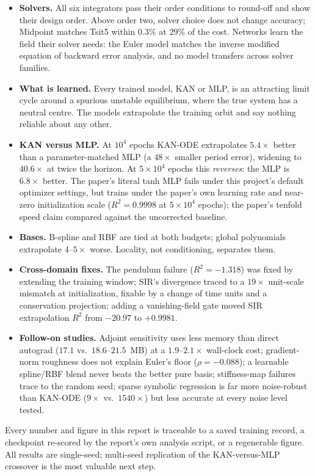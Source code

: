 \begin{keypoint}
\begin{itemize}
\item \textbf{Solvers.} All six integrators pass their order conditions to
  round-off and show their design order. Above order two, solver choice does
  not change accuracy; Midpoint matches Tsit5 within $0.3\%$ at $29\%$ of the
  cost. Networks learn the field their solver needs: the Euler model matches
  the inverse modified equation of backward error analysis, and no model
  transfers across solver families.
\item \textbf{What is learned.} Every trained model, KAN or MLP, is an
  attracting limit cycle around a spurious unstable equilibrium, where the
  true system has a neutral centre. The models extrapolate the training orbit
  and say nothing reliable about any other.
\item \textbf{KAN versus MLP.} At $10^4$ epochs KAN-ODE extrapolates
  $5.4\times$ better than a parameter-matched MLP (a $48\times$ smaller
  period error), widening to $40.6\times$ at twice the horizon. At
  $5\times10^4$ epochs this \emph{reverses}: the MLP is $6.8\times$ better.
  The paper's literal tanh MLP fails under this project's default optimizer
  settings, but trains under the paper's own learning rate and near-zero
  initialization scale ($R^2=0.9998$ at $5\times10^4$ epochs); the paper's
  tenfold speed claim compared against the uncorrected baseline.
\item \textbf{Bases.} B-spline and RBF are tied at both budgets; global
  polynomials extrapolate $4$--$5\times$ worse. Locality, not conditioning,
  separates them.
\item \textbf{Cross-domain fixes.} The pendulum failure ($R^2=-1.318$) was
  fixed by extending the training window; SIR's divergence traced to a
  $19\times$ unit-scale mismatch at initialization, fixable by a change of
  time units and a conservation projection; adding a vanishing-field gate
  moved SIR extrapolation $R^2$ from $-20.97$ to $+0.9981$.
\item \textbf{Follow-on studies.} Adjoint sensitivity uses less memory than
  direct autograd ($17.1$ vs.\ $18.6$--$21.5$~MB) at a $1.9$--$2.1\times$
  wall-clock cost; gradient-norm roughness does not explain Euler's floor
  ($\rho=-0.088$); a learnable spline/RBF blend never beats the better pure
  basis; stiffness-map failures trace to the random seed; sparse symbolic
  regression is far more noise-robust than KAN-ODE ($9\times$ vs.\
  $1540\times$) but less accurate at every noise level tested.
\end{itemize}
\end{keypoint}

Every number and figure in this report is traceable to a saved training
record, a checkpoint re-scored by the report's own analysis script, or a
regenerable figure. All results are single-seed; multi-seed replication of
the KAN-versus-MLP crossover is the most valuable next step.
